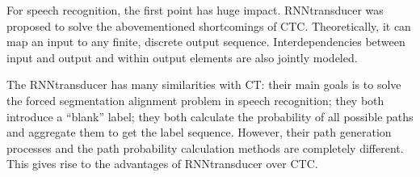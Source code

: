 \documentclass[letterpaper,10pt,english]{jupyterBook}
\begin{document}
\sphinxAtStartPar
For speech recognition, the first point has huge impact. RNN\sphinxhyphen{}transducer
was proposed to solve the above\sphinxhyphen{}mentioned shortcomings of CTC.
Theoretically, it can map an input to any finite, discrete output
sequence. Interdependencies between input and output and within output
elements are also jointly modeled.

\sphinxAtStartPar
The RNN\sphinxhyphen{}transducer has many similarities with CT: their main goals is to
solve the forced segmentation alignment problem in speech recognition;
they both introduce a “blank” label; they both calculate the probability
of all possible paths and aggregate them to get the label sequence.
However, their path generation processes and the path probability
calculation methods are completely different. This gives rise to the
advantages of RNN\sphinxhyphen{}transducer over CTC.
\end{document}

